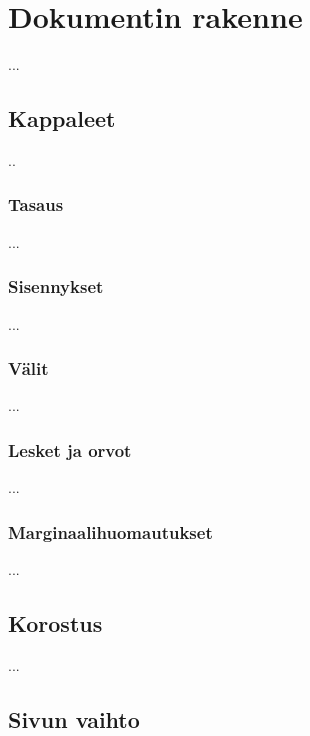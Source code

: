 \chapter{Dokumentin rakenne}

...

\section{Kappaleet}
\label{luku:kappale}

..

\subsection{Tasaus}

...

\subsection{Sisennykset}

...

\subsection{Välit}


...

\subsection{Lesket ja orvot}

...

\subsection{Marginaalihuomautukset}
\label{luku:marginaalihuomautukset}

...

\section{Korostus}

...

\section{Sivun vaihto}

